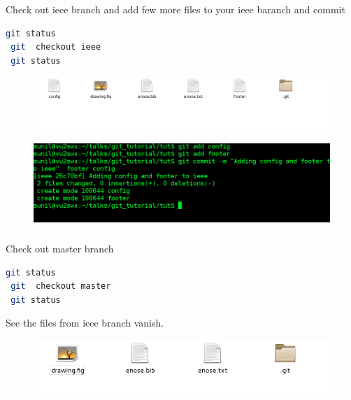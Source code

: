 \documentclass[10pt,a4paper]{beamer}
\begin{document}
\begin{frame}[fragile]
\frametitle{  }

  Check out ieee branch and add few more files to your ieee baranch and commit
  \begin{lstlisting}[language=bash]
 git status
 git  checkout ieee
 git status
\end{lstlisting}

\begin{figure}
  \includegraphics[scale=.3]{15}
 \end{figure}

\begin{figure}
  \includegraphics[scale=.3]{16}
 \end{figure}

\end{frame}



\begin{frame}[fragile]
\frametitle{  }

  Check out master branch 
  \begin{lstlisting}[language=bash]
 git status
 git  checkout master
 git status
\end{lstlisting}

See the files from ieee branch vanish.
\begin{figure}
  \includegraphics[scale=.3]{17}
 \end{figure}
 
\end{frame}
\end{document}

